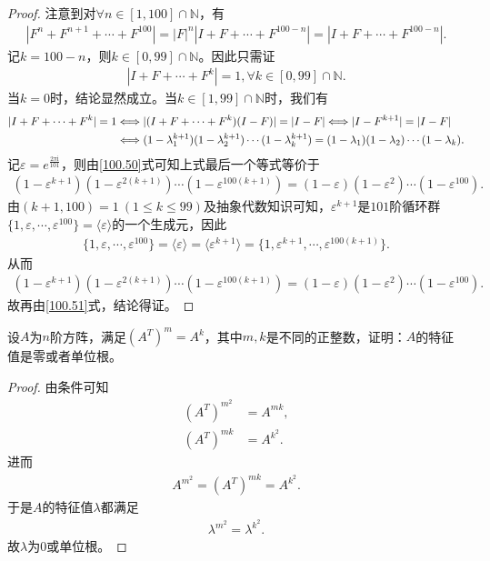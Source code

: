 \documentclass[../../main.tex]{subfiles}%
\begin{document}
\begin{proof}
注意到对$\forall n\in [1,100]\cap \mathbb{N}$，有
\begin{align*}
|F^n + F^{n + 1} + \cdots + F^{100}| = |F|^n|I + F + \cdots + F^{100 - n}| = |I + F + \cdots + F^{100 - n}|.
\end{align*}
记$k = 100 - n$，则$k\in [0,99]\cap \mathbb{N}$。因此只需证
\begin{align*}
|I + F + \cdots + F^k| = 1,\forall k\in [0,99]\cap \mathbb{N}.
\end{align*}
当$k = 0$时，结论显然成立。当$k\in [1,99]\cap \mathbb{N}$时，我们有
\begin{align}
|I + F + \cdots + F^k| = 1 &\Longleftrightarrow |(I + F + \cdots + F^k)(I - F)| = |I - F| \Longleftrightarrow |I - F^{k + 1}| = |I - F| \notag \\
&\Longleftrightarrow (1 - \lambda_1^{k + 1})(1 - \lambda_2^{k + 1})\cdots (1 - \lambda_k^{k + 1}) = (1 - \lambda_1)(1 - \lambda_2)\cdots (1 - \lambda_k). \label{100.51}
\end{align}
记$\varepsilon = e^{\frac{2\pi \mathrm{i}}{101}}$，则由\eqref{100.50}式可知上式最后一个等式等价于
\begin{align*}
(1 - \varepsilon^{k + 1})(1 - \varepsilon^{2(k + 1)})\cdots (1 - \varepsilon^{100(k + 1)}) = (1 - \varepsilon)(1 - \varepsilon^2)\cdots (1 - \varepsilon^{100}).
\end{align*}
由$(k + 1,100) = 1\ (1\leqslant k\leqslant 99)$及抽象代数知识可知，$\varepsilon^{k + 1}$是$101$阶循环群$\{1,\varepsilon,\cdots,\varepsilon^{100}\} = \langle \varepsilon \rangle$的一个生成元，因此
\begin{align*}
\{1,\varepsilon,\cdots,\varepsilon^{100}\} = \langle \varepsilon \rangle = \langle \varepsilon^{k + 1} \rangle = \{1,\varepsilon^{k + 1},\cdots,\varepsilon^{100(k + 1)}\}.
\end{align*}
从而
\begin{align*}
(1 - \varepsilon^{k + 1})(1 - \varepsilon^{2(k + 1)})\cdots (1 - \varepsilon^{100(k + 1)}) = (1 - \varepsilon)(1 - \varepsilon^2)\cdots (1 - \varepsilon^{100}).
\end{align*}
故再由\eqref{100.51}式，结论得证。 
\end{proof}

\begin{example}
设$A$为$n$阶方阵，满足$(A^T)^m = A^k$，其中$m,k$是不同的正整数，证明：$A$的特征值是零或者单位根。 
\end{example}
\begin{proof}
由条件可知
\begin{align*}
(A^T)^{m^2}&=A^{mk},\\
(A^T)^{mk}&=A^{k^2}.
\end{align*}
进而
\begin{align*}
A^{m^2}=(A^T)^{mk}=A^{k^2}.
\end{align*}
于是$A$的特征值$\lambda$都满足
\begin{align*}
\lambda^{m^2}=\lambda^{k^2}.
\end{align*}
故$\lambda$为$0$或单位根。 
\end{proof}
\end{document}
